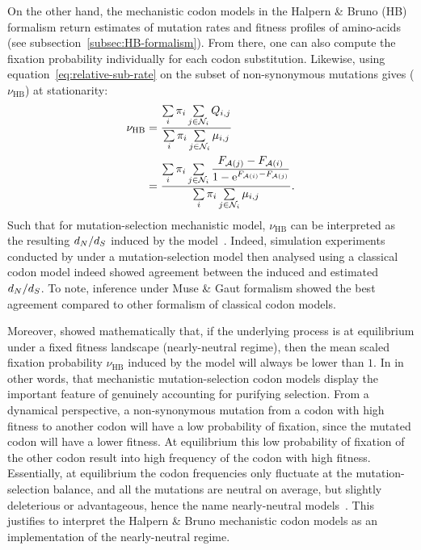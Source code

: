 On the other hand, the mechanistic codon models in the Halpern \& Bruno (HB) formalism return estimates of mutation rates and fitness profiles of amino-acids (see subsection~\ref{subsec:HB-formalism}).
From there, one can also compute the fixation probability individually for each codon substitution.
Likewise, using equation~\ref{eq:relative-sub-rate} on the subset of non-synonymous mutations gives ($\nu_{\text{HB}}$) at stationarity:
\begin{align}
    \nu_{\text{HB}} & = \dfrac{ \sum\limits_{{i}} \pi_{{i}} \sum\limits_{{j} \in \mathcal{N}_{{i}}} Q_{{i}, {j}}}{\sum\limits_{{i}} \pi_{{i}} \sum\limits_{{j} \in \mathcal{N}_{{i}}} \mu_{{i}, {j}}} \\
    & = \dfrac{ \sum\limits_{i} \pi_{i} \sum\limits_{j \in \mathcal{N}_{{i}}} \dfrac{F_{\mathcal{A}({j})} - F_{\mathcal{A}({i})}}{1 - \mathrm{e}^{F_{\mathcal{A}({i})} - F_{\mathcal{A}({j})}} }}{\sum\limits_{i} \pi_{i} \sum\limits_{j \in \mathcal{N}_{{i}} } \mu_{{i}, {j}}}.
\end{align}
Such that for mutation-selection mechanistic model, $\nu_{\text{HB}}$ can be interpreted as the resulting $d_N / d_S$ induced by the model~\citep{Spielman2015,DosReis2015}.
Indeed, simulation experiments conducted by \citet{Spielman2015} under a mutation-selection model then analysed using a classical codon model indeed showed agreement between the induced and estimated $d_N / d_S$.
To note, inference under Muse \& Gaut formalism showed the best agreement compared to other formalism of classical codon models.

Moreover, \citet{Spielman2015} showed mathematically that, if the underlying process is at equilibrium under a fixed fitness landscape (nearly-neutral regime), then the mean scaled fixation probability $\nu_{\text{HB}}$ induced by the model will always be lower than $1$.
In in other words, that mechanistic mutation-selection \gls{codon} models display the important feature of genuinely accounting for purifying selection.
From a dynamical perspective, a non-synonymous mutation from a \gls{codon} with high fitness to another \gls{codon} will have a low probability of fixation, since the mutated \gls{codon} will have a lower fitness.
At equilibrium this low probability of fixation of the other \gls{codon} result into high frequency of the \gls{codon} with high fitness.
Essentially, at equilibrium the \gls{codon} frequencies only fluctuate at the mutation-selection balance, and all the mutations are \gls{neutral} on average, but slightly deleterious or advantageous, hence the name \gls{nearly-neutral} models~\citep{Ohta1973, Ohta1992, Rodrigue2016}.
This justifies to interpret the Halpern \& Bruno mechanistic codon models as an implementation of the nearly-neutral regime.


